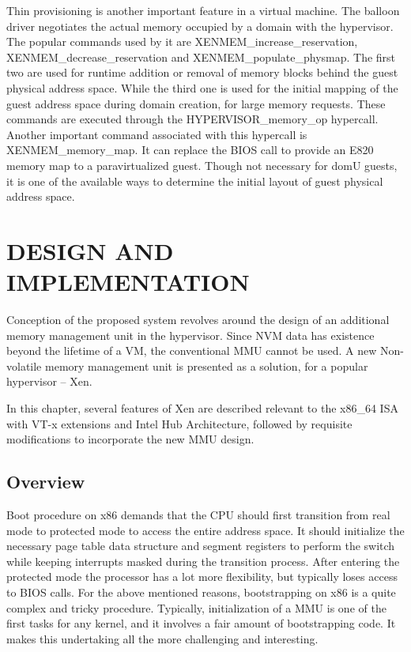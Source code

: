 Thin provisioning is another important feature in a virtual machine. The balloon driver negotiates the actual memory occupied by a domain with the hypervisor. The popular commands used by it are XENMEM\_increase\_reservation, XENMEM\_decrease\_reservation and XENMEM\_populate\_physmap. The first two are used for runtime addition or removal of memory blocks behind the guest physical address space. While the third one is used for the initial mapping of the guest address space during domain creation, for large memory requests. These commands are executed through the HYPERVISOR\_memory\_op hypercall. Another important command associated with this hypercall is XENMEM\_memory\_map. It can replace the BIOS call to provide an E820 memory map to a paravirtualized guest. Though not necessary for domU guests, it is one of the available ways to determine the initial layout of guest physical address space. 


\chapter{\uppercase{Design and Implementation}}

Conception of the proposed system revolves around the design of an additional memory management unit in the hypervisor. Since NVM data has existence beyond the lifetime of a VM, the conventional MMU cannot be used. A new Non-volatile memory management unit is presented as a solution, for a popular hypervisor -- Xen.

In this chapter, several features of Xen are described relevant to the x86\_64 ISA with VT-x extensions and Intel Hub Architecture, followed by requisite modifications to incorporate the new MMU design. 

\section{Overview}
Boot procedure on x86 demands that the CPU should first transition from real mode to protected mode to access the entire address space. It should initialize the necessary page table data structure and segment registers to perform the switch while keeping interrupts masked during the transition process. After entering the protected mode the processor has a lot more flexibility, but typically loses access to BIOS calls. For the above mentioned reasons, bootstrapping on x86 is a quite complex and tricky procedure. Typically, initialization of a MMU is one of the first tasks for any kernel, and it involves a fair amount of bootstrapping code. It makes this undertaking all the more challenging and interesting.

